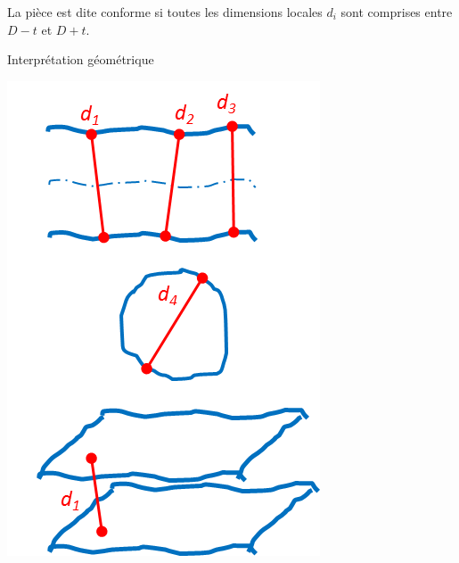 \documentclass[11pt,oneside]{article}
\begin{document}
\begin{resultat}
\begin{minipage}[t]{.3\linewidth}
La pièce est dite conforme si toutes les dimensions locales $d_i$ sont comprises entre $D-t$ et $D+t$.
\end{minipage} \hfill
\begin{minipage}[t]{.3\linewidth}
\begin{center}
Interprétation géométrique

\includegraphics[width=.95\textwidth]{png/lin_int}
\end{center}
\end{minipage}
\end{resultat}
\end{document}
